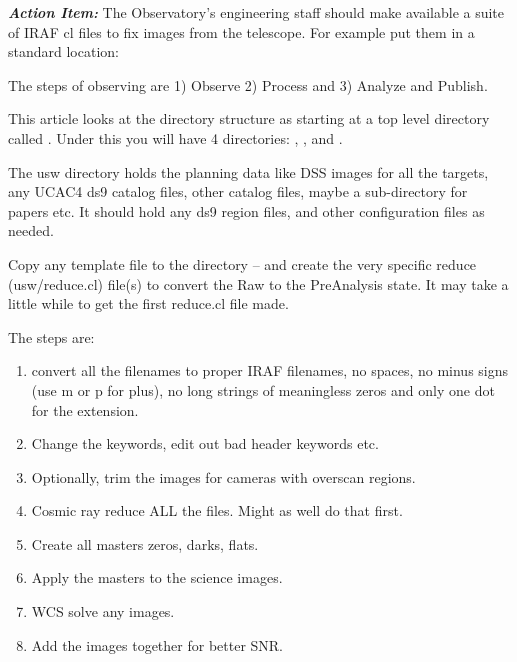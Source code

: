 \documentclass[letter,11pt,oneside]{article}
\begin{document}
\textbf{\emph{Action Item:}} The Observatory's engineering staff should make available
a suite of IRAF cl files to fix images from the telescope. For example put
them in a standard location:

{\color{verbcolor}{\verb#/opt/WhatsamattaU/iraf/DasFernrohrZwi/fixum.cl#}}

The steps of observing are 1) Observe 2) Process and 3) Analyze and Publish.

This article looks at the directory structure as starting at a top level
directory called {\color{verbcolor}{\verb#Observations/<date>#}}.
Under this you will have 4 directories: {\color{verbcolor}{\verb#usw#}},
{\color{verbcolor}{\verb#Raw#}}, {\color{verbcolor}{\verb#PreAnalysis#}}
and {\color{verbcolor}{\verb#Analysis#}}. 

The usw directory holds the planning data like DSS images for all
the targets, any UCAC4 ds9 catalog files, other catalog files,
maybe a sub-directory for papers etc. It should hold any ds9
region files, and other configuration files as needed. 

Copy any template {\color{verbcolor}{\verb#cl#}} file to the
{\color{verbcolor}{\verb#usw#}} directory -- and create the very
specific reduce {\color{verbcolor}{\verb#cl#}} (usw/reduce.cl) file(s)
to convert the Raw to the PreAnalysis state. It may take a little
while to get the first reduce.cl file made.

The steps are:

\vspace{-.15cm}
\begin{enumerate}\addtolength{\itemsep}{-0.5\baselineskip}
   \item   convert all the filenames to proper IRAF filenames, no spaces, no
minus signs (use m or p for plus), no long strings of meaningless
zeros and only one dot for the extension.
   \item   Change the keywords, edit out bad header keywords etc.
   \item   Optionally, trim the images for cameras with overscan regions.
   \item   Cosmic ray reduce ALL the files. Might as well do that first.
   \item   Create all masters zeros, darks, flats.
   \item   Apply the masters to the science images.
   \item   WCS solve any images.
   \item   Add the images together for better SNR.
\end{enumerate}
\end{document}
